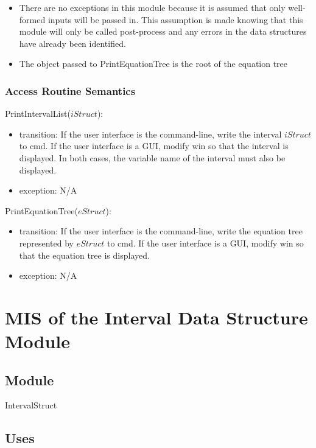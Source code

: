 \documentclass[12pt, titlepage]{article}
\begin{document}
\begin{itemize}
	\item There are no exceptions in this module because it is assumed that 
	only well-formed inputs will be passed in. This assumption is made knowing 
	that this module will only be called post-process and any errors in the 
	data structures have already been identified.
	\item The object passed to PrintEquationTree is the root of the equation 
	tree
\end{itemize}


\subsubsection{Access Routine Semantics}

\noindent PrintIntervalList($iStruct$):
\begin{itemize}
	\item transition: If the user interface is the command-line, write the 
	interval $iStruct$ to cmd. If the user interface is a GUI, modify win so 
	that the interval is displayed. In both cases, the variable name of the 
	interval must also be displayed.
	\item exception: N/A
\end{itemize}

\noindent PrintEquationTree($eStruct$):
\begin{itemize}
	\item transition: If the user interface is the command-line, write the 
	equation tree represented by $eStruct$ to cmd. If the user interface is a 
	GUI, modify win so that the equation tree is displayed.
	\item exception: N/A
\end{itemize}

\newpage

\section{MIS of the Interval Data Structure Module} 
\label{Module_intervaldatastructure}

\subsection{Module}

IntervalStruct

\subsection{Uses}
\end{document}

